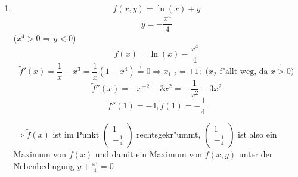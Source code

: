 \documentclass[fleqn,13pt]{scrartcl}
\begin{document}
\begin{enumerate}

	\item
		\begin{equation*}
			f(x,y) = \ln(x) + y
		\end{equation*}
		\begin{equation*}
			y = -\frac{x^4}4
		\end{equation*}
		($x^4 > 0 \Rightarrow y < 0$)
		\begin{equation*}
			\tilde f(x) = \ln(x) - \frac{x^4}4
		\end{equation*}
		\begin{equation*}
			\tilde f'(x) = \frac1x - x^3 = \frac1x(1 - x^4)\overset!= 0 \Rightarrow x_{1,2} = \pm1; \text{ ($x_2$ f"allt weg, da $x \overset!> 0$)}
		\end{equation*}
		\begin{equation*}
			\tilde f''(x) = -x^{-2} -3x^2 = -\frac1{x^2} - 3x^2
		\end{equation*}
		\begin{equation*}
			\tilde f''(1) = -4, \tilde f(1) = -\frac14
		\end{equation*}

	$\Rightarrow \tilde f(x)$ ist im Punkt $\begin{pmatrix}1\\ -\frac14\end{pmatrix}$ rechtsgekr"ummt, $\begin{pmatrix}1\\ -\frac14\end{pmatrix}$ ist also ein Maximum von $\tilde f(x)$ und damit ein Maximum von $f(x,y)$ unter der Nebenbedingung $y + \frac{x^4}4 = 0$



\end{enumerate}
\end{document}
